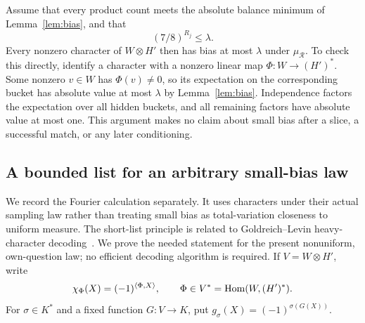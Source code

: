 Assume that every product count meets the absolute balance minimum of
Lemma~\ref{lem:bias}, and that
\begin{equation}\label{eq:upper-R}
 (7/8)^{R_j}\le\lambda.
\end{equation}
Every nonzero character of $W\otimes H'$ then has bias at most $\lambda$
under $\mu_{\mathcal R}$.  To check this directly, identify a character
with a nonzero linear map $\Phi:W\longrightarrow(H')^*$.  Some nonzero
$v\in W$ has $\Phi(v)\ne0$, so its expectation on the corresponding
bucket has absolute value at most $\lambda$ by Lemma~\ref{lem:bias}.
Independence factors the expectation over all hidden buckets, and all
remaining factors have absolute value at most one.  This argument makes
no claim about small bias after a slice, a successful match, or any later
conditioning.

\subsection{A bounded list for an arbitrary small-bias law}

We record the Fourier calculation separately.  It uses characters under
their actual sampling law rather than treating small bias as total-variation
closeness to uniform measure.  The short-list principle is related to
Goldreich--Levin heavy-character decoding~\cite{GoldreichLevin1989}.
We prove the needed statement for the present nonuniform, own-question law;
no efficient decoding algorithm is required.  If $V=W\otimes H'$, write
\[
 \chi_\Phi(X)=(-1)^{\langle\Phi,X\rangle},\qquad
 \Phi\in V^*=\operatorname{Hom}(W,(H')^*).
\]
For $\sigma\in K^*$ and a fixed function $G:V\longrightarrow K$, put
$g_\sigma(X)=(-1)^{\sigma(G(X))}$.

